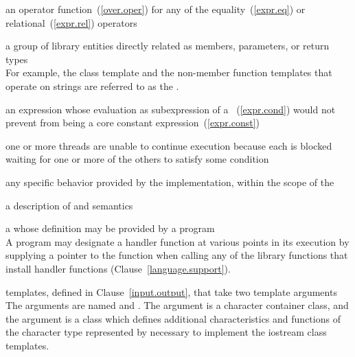 %
an operator function~(\ref{over.oper}) for any of the equality~(\ref{expr.eq}) or
relational~(\ref{expr.rel}) operators

%
a group of library entities directly related as members, parameters, or
return types\\
\enternote
For example, the class template
and the non-member
function templates
that operate on
strings are referred to as the
.
\exitnote

%
an expression whose evaluation as subexpression of a
~(\ref{expr.cond}) would not prevent 
from being a core constant expression~(\ref{expr.const})

%
one or more threads are unable to continue execution because each is
blocked waiting for one or more of the others to satisfy some condition

%
any specific behavior provided by the implementation,
within the scope of the

%
a description of
and
semantics

%
a
whose definition may be provided by a \Cpp program\\
\enternote
A \Cpp program may designate a handler function at various points in its execution by
supplying a pointer to the function when calling any of the library functions that install
handler functions (Clause~\ref{language.support}).
\exitnote

templates, defined in Clause~\ref{input.output},
that take two template arguments\\
\enternote
The arguments are named
and
.
The argument
is a character container class,
and the argument
is a class which defines additional characteristics and functions
of the character type represented by
necessary to implement the iostream class templates.
\exitnote

